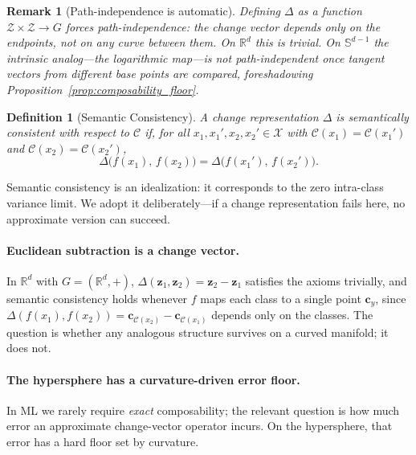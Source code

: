 \documentclass{article}
\newtheorem{definition}{Definition}
\newtheorem*{remark}{Remark}
\newcommand{\vect}[1]{\mathbf{#1}}
\newcommand{\R}{\mathbb{R}}
\newcommand{\Sph}{\mathbb{S}}
\begin{document}
\begin{remark}[Path-independence is automatic]
\label{rem:path_independence}
Defining $\Delta$ as a function $\mathcal{Z} \times \mathcal{Z} \to G$ forces \emph{path-independence}: the change vector depends only on the endpoints, not on any curve between them. On $\R^d$ this is trivial. On $\Sph^{d-1}$ the intrinsic analog---the logarithmic map---is not path-independent once tangent vectors from different base points are compared, foreshadowing Proposition~\ref{prop:composability_floor}.
\end{remark}

\begin{definition}[Semantic Consistency]
\label{def:semantic_consistency}
A change representation $\Delta$ is \emph{semantically consistent} with respect to $\mathcal{C}$ if, for all $x_1, x_1', x_2, x_2' \in \mathcal{X}$ with $\mathcal{C}(x_1) = \mathcal{C}(x_1')$ and $\mathcal{C}(x_2) = \mathcal{C}(x_2')$,
\[
    \Delta\!\bigl(f(x_1),\, f(x_2)\bigr) = \Delta\!\bigl(f(x_1'),\, f(x_2')\bigr).
\]
\end{definition}

\noindent Semantic consistency is an idealization: it corresponds to the zero intra-class variance limit. We adopt it deliberately---if a change representation fails here, no approximate version can succeed.

\paragraph{Euclidean subtraction is a change vector.} In $\R^d$ with $G = (\R^d, +)$, $\Delta(\vect{z}_1, \vect{z}_2) = \vect{z}_2 - \vect{z}_1$ satisfies the axioms trivially, and semantic consistency holds whenever $f$ maps each class to a single point $\vect{c}_y$, since $\Delta(f(x_1), f(x_2)) = \vect{c}_{\mathcal{C}(x_2)} - \vect{c}_{\mathcal{C}(x_1)}$ depends only on the classes. The question is whether any analogous structure survives on a curved manifold; it does not.

\paragraph{The hypersphere has a curvature-driven error floor.}
\label{sec:sphere_failures}

In ML we rarely require \emph{exact} composability; the relevant question is how much error an approximate change-vector operator incurs. On the hypersphere, that error has a hard floor set by curvature.
\end{document}
